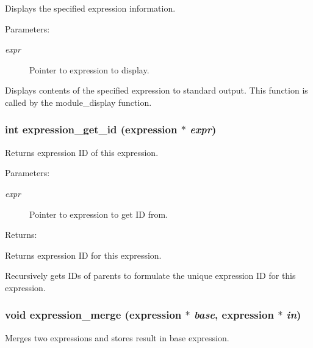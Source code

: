 Displays the specified expression information.

\begin{Desc}
\item[Parameters: ]\par
\begin{description}
\item[{\em 
expr}]Pointer to expression to display.\end{description}
\end{Desc}
Displays contents of the specified expression to standard output. This function is called by the module\_\-display function. 
\subsubsection{\setlength{\rightskip}{0pt plus 5cm}int expression\_\-get\_\-id ({\bf expression} $\ast$ {\em expr})}\label{expr_8h_a2}


Returns expression ID of this expression.

\begin{Desc}
\item[Parameters: ]\par
\begin{description}
\item[{\em 
expr}]Pointer to expression to get ID from. \end{description}
\end{Desc}
\begin{Desc}
\item[Returns: ]\par
Returns expression ID for this expression.\end{Desc}
Recursively gets IDs of parents to formulate the unique expression ID for this expression. 
\subsubsection{\setlength{\rightskip}{0pt plus 5cm}void expression\_\-merge ({\bf expression} $\ast$ {\em base}, {\bf expression} $\ast$ {\em in})}\label{expr_8h_a1}


Merges two expressions and stores result in base expression.

